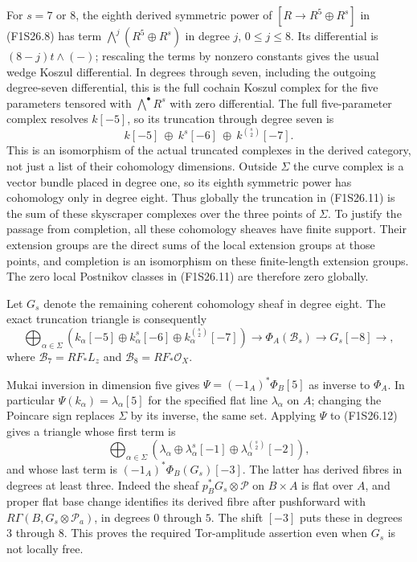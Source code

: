For $s=7$ or $8$, the eighth derived symmetric power of
$[R\to R^5\oplus R^s]$ in (F1S26.8) has term
$\bigwedge^j(R^5\oplus R^s)$ in degree $j$, $0\le j\le8$.
Its differential is $(8-j)t\wedge(-)$; rescaling the terms
by nonzero constants gives the usual wedge Koszul differential.
In degrees through seven, including the outgoing degree-seven
differential, this is the full cochain Koszul complex for the
five parameters tensored with $\bigwedge^\bullet R^s$ with
zero differential. The full five-parameter complex resolves
$k[-5]$, so its truncation through degree seven is
\[
 k[-5]\ \oplus\ k^s[-6]\ \oplus\ k^{\binom s2}[-7].
 \tag{F1S26.11}
\]
This is an isomorphism of the actual truncated complexes in
the derived category, not just a list of their cohomology
dimensions. Outside $\Sigma$ the curve complex is a vector
bundle placed in degree one, so its eighth symmetric power
has cohomology only in degree eight. Thus globally the
truncation in (F1S26.11) is the sum of these skyscraper
complexes over the three points of $\Sigma$. To justify the
passage from completion, all these cohomology sheaves have
finite support. Their extension groups are the direct sums
of the local extension groups at those points, and completion
is an isomorphism on these finite-length extension groups.
The zero local Postnikov classes in (F1S26.11) are therefore
zero globally.

Let $G_s$ denote the remaining coherent cohomology sheaf in
degree eight. The exact truncation triangle is consequently
\[
 \bigoplus_{\alpha\in\Sigma}
       (k_\alpha[-5]\oplus k_\alpha^s[-6]
                         \oplus k_\alpha^{\binom s2}[-7])
 \longrightarrow\Phi_A(\mathcal B_s)
 \longrightarrow G_s[-8]\longrightarrow,
 \tag{F1S26.12}
\]
where $\mathcal B_7=RF_*L_z$ and
$\mathcal B_8=RF_*\mathcal O_X$.

Mukai inversion in dimension five gives
$\Psi=( -1_A)^*\Phi_B[5]$ as inverse to $\Phi_A$.
In particular $\Psi(k_\alpha)=\lambda_\alpha[5]$ for the
specified flat line $\lambda_\alpha$ on $A$; changing the
Poincare sign replaces $\Sigma$ by its inverse, the same set.
Applying $\Psi$ to (F1S26.12) gives a triangle whose first
term is
\[
 \bigoplus_{\alpha\in\Sigma}
  (\lambda_\alpha\oplus\lambda_\alpha^s[-1]
                         \oplus\lambda_\alpha^{\binom s2}[-2]),
 \tag{F1S26.13}
\]
and whose last term is $( -1_A)^*\Phi_B(G_s)[-3]$.
The latter has derived fibres in degrees at least three.
Indeed the sheaf $p_B^*G_s\otimes\mathcal P$ on $B\times A$
is flat over $A$, and proper flat base change identifies its
derived fibre after pushforward with
$R\Gamma(B,G_s\otimes\mathcal P_a)$, in degrees $0$ through
$5$. The shift $[-3]$ puts these in degrees $3$ through $8$.
This proves the required Tor-amplitude assertion even when
$G_s$ is not locally free.

